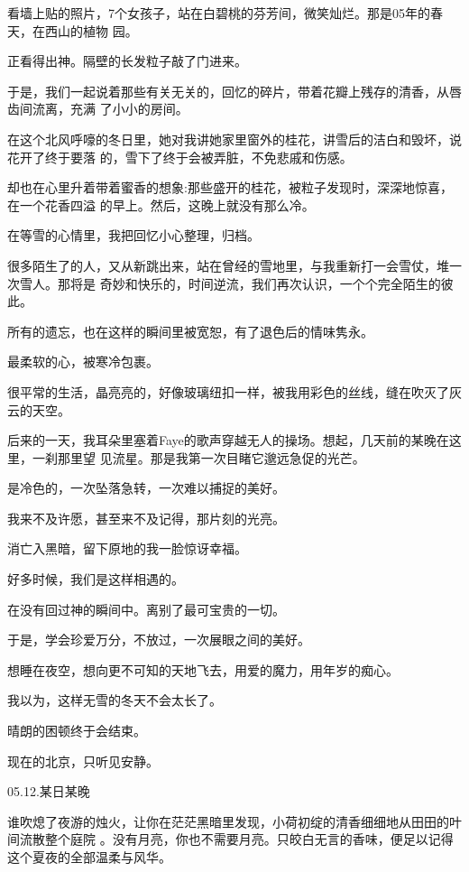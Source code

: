 \documentclass[12pt,a4paper]{article}
\begin{document}
		看墙上贴的照片，7个女孩子，站在白碧桃的芬芳间，微笑灿烂。那是05年的春天，在西山的植物
	园。

		正看得出神。隔壁的长发粒子敲了门进来。

		于是，我们一起说着那些有关无关的，回忆的碎片，带着花瓣上残存的清香，从唇齿间流离，充满
	了小小的房间。

		在这个北风呼嚎的冬日里，她对我讲她家里窗外的桂花，讲雪后的洁白和毁坏，说花开了终于要落
	的，雪下了终于会被弄脏，不免悲戚和伤感。

		却也在心里升着带着蜜香的想象:那些盛开的桂花，被粒子发现时，深深地惊喜，在一个花香四溢
	的早上。然后，这晚上就没有那么冷。

		在等雪的心情里，我把回忆小心整理，归档。

		很多陌生了的人，又从新跳出来，站在曾经的雪地里，与我重新打一会雪仗，堆一次雪人。那将是
	奇妙和快乐的，时间逆流，我们再次认识，一个个完全陌生的彼此。

		所有的遗忘，也在这样的瞬间里被宽恕，有了退色后的情味隽永。\par
		最柔软的心，被寒冷包裹。\par
		很平常的生活，晶亮亮的，好像玻璃纽扣一样，被我用彩色的丝线，缝在吹灭了灰云的天空。


		后来的一天，我耳朵里塞着Faye的歌声穿越无人的操场。想起，几天前的某晚在这里，一刹那里望
	见流星。那是我第一次目睹它邈远急促的光芒。

		是冷色的，一次坠落急转，一次难以捕捉的美好。\par
		我来不及许愿，甚至来不及记得，那片刻的光亮。\par
		消亡入黑暗，留下原地的我一脸惊讶幸福。\par
		好多时候，我们是这样相遇的。\par
		在没有回过神的瞬间中。离别了最可宝贵的一切。\par
		于是，学会珍爱万分，不放过，一次展眼之间的美好。


		想睡在夜空，想向更不可知的天地飞去，用爱的魔力，用年岁的痴心。


		我以为，这样无雪的冬天不会太长了。\par
		晴朗的困顿终于会结束。


		现在的北京，只听见安静。

		05.12.某日某晚

	\endwriting



		谁吹熄了夜游的烛火，让你在茫茫黑暗里发现，小荷初绽的清香细细地从田田的叶间流散整个庭院
	。没有月亮，你也不需要月亮。只皎白无言的香味，便足以记得这个夏夜的全部温柔与风华。
\end{document}
